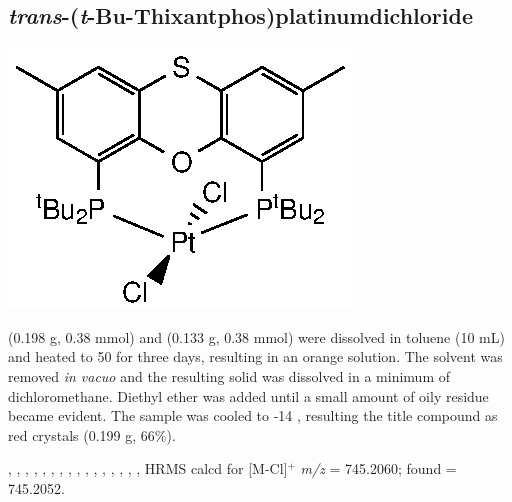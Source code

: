 \subsection*{\emph{trans}-(\emph{t}-Bu-Thixantphos)platinumdichloride}
\begin{structure}[h]
\begin{center}
\includegraphics{../Structures/StBuPtCl2.eps}
\end{center}
\end{structure}

\tBuThixantphos (0.198 g, 0.38 mmol) and \ce{[Pt(hex)Cl2]} (0.133 g, 0.38 mmol) were dissolved in toluene (10 mL) and heated to 50 \degC for three days, resulting in an orange solution.  The solvent was removed \emph{in vacuo} and the resulting solid was dissolved in a minimum of dichloromethane.  Diethyl ether was added until a small amount of oily residue became evident.  The sample was cooled to -14 \degC, resulting the title compound as red crystals (0.199 g, 66\%).

,
,
,
,
,
,
,
,
,
,
,
,
,
,
,
,
HRMS calcd for  [M-Cl]$^+$ \emph{m/z} = 745.2060; found = 745.2052.


